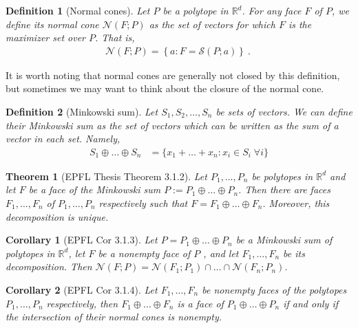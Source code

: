 \documentclass[12pt]{article}
\newcommand{\reals}{\mathbb{R}}
\newcommand{\N}{\mathcal{N}}
\newtheorem{theorem}{Theorem}
\newtheorem{definition}{Definition}
\newtheorem{corollary}{Corollary}
\begin{document}
\begin{definition}[Normal cones]
  Let $P$ be a polytope in $\reals^d$.
  For any face $F$ of $P$, we define its \emph{normal cone} $\N(F;P)$ as the set of vectors for which $F$ is the maximizer set over $P$.
  That is,
  \begin{align*}
    \N(F;P) = \left\{a : F = \mathcal{S}(P; a) \right\}~.~
  \end{align*}
\end{definition}

  It is worth noting that normal cones are generally not closed by this definition, but sometimes we may want to think about the closure of the normal cone.

\begin{definition}[Minkowski sum]
	Let $S_1, S_2, \ldots, S_n$ be sets of vectors.
	We can define their \emph{Minkowski sum} as the set of vectors which can be written as the sum of a vector in each set.
	Namely,
	\begin{align*}
	S_1 \oplus \ldots \oplus S_n &= \{x_1 + \ldots + x_n : x_i \in S_i \; \forall i \}
	\end{align*}
\end{definition}

\begin{theorem}[EPFL Thesis Theorem 3.1.2]\label{thm:unique-face-decomp}
	Let $P_1, \ldots, P_n$ be polytopes in $\reals^d$ and let $F$ be a face of the Minkowski sum $P := P_1 \oplus \ldots \oplus P_n$.
	Then there are faces $F_1, \ldots, F_n$ of $P_1, \ldots, P_n$ respectively such that $F = F_1 \oplus \ldots \oplus F_n$.
	Moreover, this decomposition is unique.
\end{theorem}

\begin{corollary}[EPFL Cor 3.1.3]\label{cor:face-decomp-normal-cones}
  Let $P = P_1 \oplus \ldots \oplus P_n$ be a Minkowski sum of polytopes in $\reals^d$, let $F$ be a nonempty face of $P$ , and let $F_1, \ldots, F_n$ be its decomposition.
  Then $\N(F;P) = \N(F_1;P_1) \cap \ldots \cap \N(F_n; P_n)$.
\end{corollary}

\begin{corollary}[EPFL Cor 3.1.4]
  Let $F_1, \ldots, F_n$ be nonempty faces of the polytopes $P_1, \ldots, P_n$ respectively, then $F_1 \oplus \ldots \oplus F_n$ is a face of $P_1 \oplus \ldots \oplus P_n$ if and only if the intersection of their normal cones is nonempty.
\end{corollary}
\end{document}
